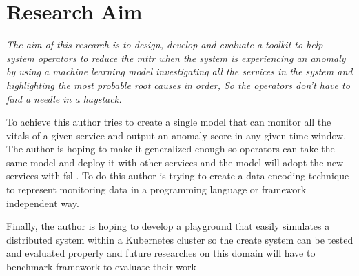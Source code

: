 
{\let\clearpage\relax\chapter{Research Aim}}

\textit{The aim of this research is to design, develop and evaluate a toolkit to help system operators to reduce the \ac{mttr} when the system is experiencing an anomaly by using a machine learning model investigating all the services in the system and highlighting the most probable root causes in order, So the operators don't have to find a needle in a haystack.}

To achieve this author tries to create a single model that can monitor all the vitals of a given service and output an anomaly score in any given time window. The author is hoping to make it generalized enough so operators can take the same model and deploy it with other services and the model will adopt the new services with \ac{fsl} \citep{wang2020generalizing}. To do this author is trying to create a data encoding technique to represent monitoring data in a programming language or framework independent way.

Finally, the author is hoping to develop a playground that easily simulates a distributed system within a Kubernetes cluster so the create system can be tested and evaluated properly and future researches on this domain will have to benchmark framework to evaluate their work
